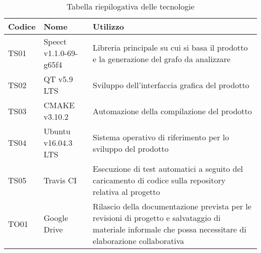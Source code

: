 \documentclass[./../Technology Baseline.tex]{subfiles}
\begin{document}
\begin{longtable}{| p{2cm} | p{3.5cm} |p{7cm} |}
	\caption {Tabella riepilogativa delle tecnologie} \label{tab:title} \\
	\hline
	\textbf{Codice} & \textbf{Nome} & \textbf{Utilizzo} \\
	\hline
	\endhead
	
	\newline TS01&
	\newline Speect v1.1.0-69-g65f4&
	\newline Libreria principale su cui si basa il prodotto e la generazione del grafo da analizzare \newline
	\\[1em]
	
	\newline TS02&
	\newline QT v5.9 LTS&
	\newline Sviluppo dell'interfaccia grafica del prodotto \newline
	\\[1em]
	
	
	\newline TS03&
	\newline CMAKE v3.10.2&
	\newline Automazione della compilazione del prodotto \newline
	\\[1em]
	
	\newline TS04&
	\newline Ubuntu v16.04.3 LTS&
	\newline Sistema operativo di riferimento per lo sviluppo del prodotto \newline
	\\[1em]
	
	\newline TS05&
	\newline Travis CI&
	\newline Esecuzione di test automatici a seguito del caricamento di codice sulla repository relativa al progetto \newline
	\\[1em]
	
	\newline TO01&
	\newline Google Drive&
	\newline Rilascio della documentazione prevista per le revisioni di progetto e salvataggio di materiale informale che possa necessitare di elaborazione collaborativa \newline
	\\[1em]
	

\end{longtable}
\end{document}
